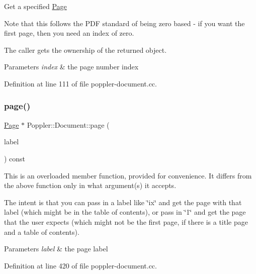 Get a specified \hyperlink{class_poppler_1_1_page}{Page}

Note that this follows the P\+DF standard of being zero based -\/ if you want the first page, then you need an index of zero.

The caller gets the ownership of the returned object.


\begin{DoxyParams}{Parameters}
{\em index} & the page number index \\
\hline
\end{DoxyParams}


Definition at line 111 of file poppler-\/document.\+cc.

\mbox{\label{class_poppler_1_1_document_a362452915b71f8d534114781c27e6dc0}} 
\subsubsection{\texorpdfstring{page()}{page()}\hspace{0.1cm}{\footnotesize\ttfamily [2/2]}}
{\footnotesize\ttfamily \hyperlink{class_poppler_1_1_page}{Page} $\ast$ Poppler\+::\+Document\+::page (\begin{DoxyParamCaption}\item[{const Q\+String \&}]{label }\end{DoxyParamCaption}) const}

This is an overloaded member function, provided for convenience. It differs from the above function only in what argument(s) it accepts.

The intent is that you can pass in a label like {\ttfamily \char`\"{}ix\char`\"{}} and get the page with that label (which might be in the table of contents), or pass in {\ttfamily \char`\"{}1\char`\"{}} and get the page that the user expects (which might not be the first page, if there is a title page and a table of contents).


\begin{DoxyParams}{Parameters}
{\em label} & the page label \\
\hline
\end{DoxyParams}


Definition at line 420 of file poppler-\/document.\+cc.

\mbox{\label{class_poppler_1_1_document_a7074424a989911de79f781ab77b23652}} 

